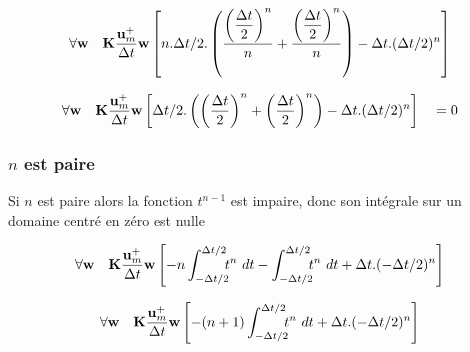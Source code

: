 \documentclass[12pt,a4paper]{report}
\begin{document}
\begin{equation}
\begin{array}{r l}
	\forall \mathbf{w}
	&\displaystyle
	 \mathbf{K} \frac{\mathbf{u}_m^+}{\Delta t} \mathbf{w}	 	
	 		\left[ \displaystyle
	 	  		n.\Delta t/2. 
	 	  		\left(
	 	  			\frac{\left( \displaystyle\frac{\Delta t}{2} \right)^n}{n} 
	 	  			+\frac{\left(\displaystyle\frac{\Delta t}{2}\right)^n}{n} 
	 	  		\right)
	 	  			 - \Delta t .(\Delta t/2)^n
	 	\right]
\end{array}
\end{equation}

\begin{equation}
\begin{array}{r l}
	\forall \mathbf{w}
	&\displaystyle
	 \mathbf{K} \frac{\mathbf{u}_m^+}{\Delta t} \mathbf{w}	 	
	 		\left[ \displaystyle
	 	  		\Delta t/2. 
	 	  		\left(
	 	  			\left( \displaystyle\frac{\Delta t}{2} \right)^n
	 	  			+\left(\displaystyle\frac{\Delta t}{2}\right)^n 
	 	  		\right)
	 	  			 - \Delta t .(\Delta t/2)^n
	 	\right]~~~=0
\end{array}
\end{equation}

\subsubsection{$n$ est paire}
Si $n$ est paire alors la fonction $t^{n-1}$ est impaire, donc son intégrale sur un domaine centré en zéro est nulle


\begin{equation}
\begin{array}{r l l}
	\forall \mathbf{w}
	&\displaystyle
	 \mathbf{K} \frac{\mathbf{u}_m^+}{\Delta t} \mathbf{w}	 	
	 		\left[ \displaystyle
	 	 		- n \int_{-\Delta t/2}^{\Delta t/2} \!\!\!  t^n 	~dt 	
	 	 		-\int_{-\Delta t/2}^{\Delta t/2} \!\!\!  t^n 	~dt
	 	 + \Delta t .(-\Delta t/2)^n
	 	\right]
\end{array}
\end{equation}

\begin{equation}
\begin{array}{r l l}
	\forall \mathbf{w}
	&\displaystyle
	 \mathbf{K} \frac{\mathbf{u}_m^+}{\Delta t} \mathbf{w}	 	
	 		\left[ \displaystyle
	 	 		- (n+1) \int_{-\Delta t/2}^{\Delta t/2} \!\!\!  t^n 	~dt
	 	 + \Delta t .(-\Delta t/2)^n
	 	\right]
\end{array}
\end{equation}
\end{document}
